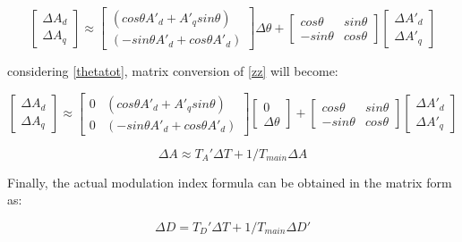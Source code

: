 \begin{equation}\label{zz}
\begin{bmatrix}\Delta A_d\\\Delta A_q\end{bmatrix}\approx \begin{bmatrix} (cos\theta A'_d + A'_q sin\theta) \\ (-sin\theta A'_d+ cos\theta A'_d) \end{bmatrix}\Delta \theta +  \begin{bmatrix}cos\theta & sin\theta\\-sin\theta & cos\theta\end{bmatrix}  \begin{bmatrix}\Delta A'_d\\\Delta A'_q\end{bmatrix}
\end{equation}

considering \ref{thetatot}, matrix conversion of \ref{zz} will become:

\begin{equation}\label{}
\begin{bmatrix}\Delta A_d\\\Delta A_q\end{bmatrix}\approx \begin{bmatrix} 0 & (cos\theta A'_d + A'_q sin\theta) \\ 0 & (-sin\theta A'_d+ cos\theta A'_d) \end{bmatrix}\begin{bmatrix}0 \\\Delta \theta \end{bmatrix}+  \begin{bmatrix}cos\theta & sin\theta\\-sin\theta & cos\theta\end{bmatrix}  \begin{bmatrix}\Delta A'_d\\\Delta A'_q\end{bmatrix}
\end{equation}

\begin{equation}\label{}
\Delta A\approx T_A' \Delta T+  1/T_{main} \Delta A
\end{equation}

Finally, the actual modulation index formula can be obtained in the matrix form as: 

\begin{equation}\label{}
\Delta D = T_D' \Delta T+  1/T_{main} \Delta D'
\end{equation}

